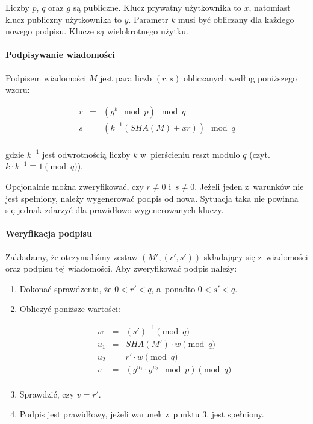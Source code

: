 \documentclass{article}
\begin{document}
        Liczby $p$, $q$ oraz $g$ są publiczne. Klucz prywatny użytkownika to $x$, natomiast klucz publiczny użytkownika to $y$. Parametr $k$ musi być obliczany dla każdego nowego podpisu. Klucze są wielokrotnego użytku.
        
        \paragraph*{Podpisywanie wiadomości} Podpisem wiadomości $M$ jest para liczb $(r, s)$ obliczanych według poniższego wzoru:
        
        \begin{equation*}
            \begin{array}{lcl}
                r & = & (g^{k} \mod p) \mod q \\
                s & = & (k^{-1} (SHA(M) + xr)) \mod q \\
            \end{array}
        \end{equation*}
        
        \noindent gdzie $k^{-1}$ jest odwrotnością liczby $k$ w~pierścieniu reszt modulo $q$ (czyt. $k \cdot k^{-1} \equiv 1 \pmod q$). 
        
        Opcjonalnie można zweryfikować, czy $r \neq 0$ i~$s \neq 0$. Jeżeli jeden z~warunków nie jest spełniony, należy wygenerować podpis od nowa. Sytuacja taka nie powinna się jednak zdarzyć dla prawidłowo wygenerowanych kluczy.
        
        \paragraph*{Weryfikacja podpisu} Zakładamy, że otrzymaliśmy zestaw $(M', (r', s'))$ składający się z~wiadomości oraz podpisu tej wiadomości. Aby zweryfikować podpis należy:
        
        \begin{enumerate}
            \item Dokonać sprawdzenia, że $0 < r' < q$, a~ponadto $0 < s' < q$.
            \item Obliczyć poniższe wartości:
            
                \begin{equation*}
                    \begin{array}{lcl}
                        w & = & (s')^{-1} \pmod q \\
                        u_{1} & = & SHA(M') \cdot w \pmod q \\
                        u_{2} & = & r' \cdot w \pmod q \\
                        v & = & (g^{u_{1}} \cdot y^{u_{2}} \mod p) \pmod q \\
                    \end{array}
                \end{equation*}
            \item Sprawdzić, czy $v = r'$.
            \item Podpis jest prawidłowy, jeżeli warunek z~punktu 3. jest spełniony.
        \end{enumerate}
        
\end{document}
